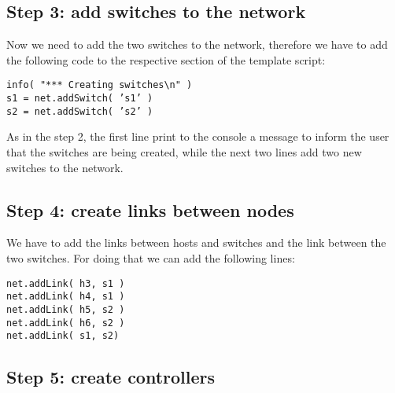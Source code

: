 \documentclass[12pt, a4paper]{article}
\newcommand{\code}[1]{{\footnotesize\texttt{#1}}}
\begin{document}
\subsection*{Step 3: add switches to the network}
Now we need to add the two switches to the network, therefore we have to add the
following code to the respective section of the template script:

\code{info( "*** Creating switches\textbackslash n" )} \\
\code{s1 = net.addSwitch( 's1' )} \\
\code{s2 = net.addSwitch( 's2' )}

As in the step 2, the first line print to the console a message to inform the user
that the switches are being created, while the next two lines add two new switches
to the network.



\subsection*{Step 4: create links between nodes}
We have to add the links between hosts and switches and the link between the two
switches. For doing that we can add the following lines:

\code{net.addLink( h3, s1 )} \\
\code{net.addLink( h4, s1 )} \\
\code{net.addLink( h5, s2 )} \\
\code{net.addLink( h6, s2 )} \\
\code{net.addLink( s1, s2)}

\subsection*{Step 5: create controllers}
\end{document}
